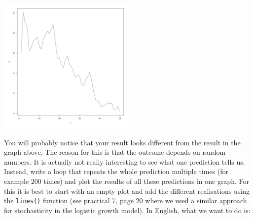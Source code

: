 \documentclass{article}\usepackage[]{graphicx}\usepackage[]{color}
\newenvironment{knitrout}{}{} %
\begin{document}
\begin{knitrout}
\color{fgcolor}

{\centering \includegraphics[width=0.5\textwidth]{figure/sim_one-1} 

}



\end{knitrout}

You will probably notice that your result looks different from the result in the graph above. The reason for this is that the outcome depends on random numbers. It is actually not really interesting to see what one prediction tells us. Instead, write a loop that repeats the whole prediction multiple times (for example $200$ times) and plot the results of all these predictions in one graph. For this it is best to start with an empty plot and add the different realisations using the \texttt{lines()} function (see practical 7, page 20 where we used a similar approach for stochasticity in the logistic growth model). In English, what we want to do is:
\end{document}
